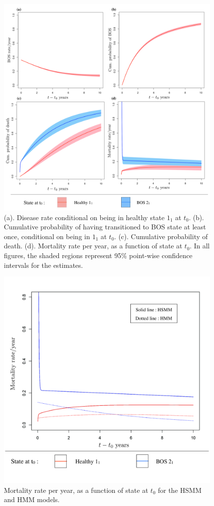 \documentclass{uwstat572}
\begin{document}
\begin{figure}[]
\centering
\includegraphics[scale=0.45]{4plots4.pdf}
\caption{(a). Disease rate conditional on being in healthy state $1_1$ at $t_0$. (b). Cumulative probability of having transitioned to BOS state at least once, conditional on being in $1_1$ at $t_0$. (c). Cumulative probability of death. (d). Mortality rate per year, as a function of state at $t_0$. In all figures, the shaded regions represent 95\% point-wise confidence intervals for the estimates.
}
\end{figure}


\begin{figure}
\centering
\includegraphics[scale=0.33]{mortcomp_hsmmhmmkey.pdf}
\caption{Mortality rate per year, as a function of state at $t_0$ for the HSMM and HMM models.}
\end{figure}
\end{document}
